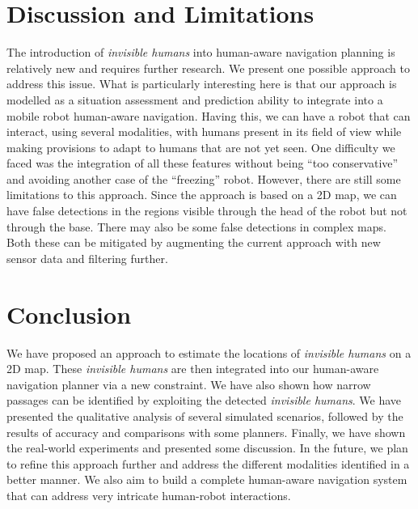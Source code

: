 \section{Discussion and Limitations}\label{discussion_chap5}
The introduction of \textit{invisible humans} into human-aware navigation planning is relatively new and requires further research. We present one possible approach to address this issue. What is particularly interesting here is that our approach is modelled as a situation assessment and prediction ability to integrate into a mobile robot human-aware navigation. Having this, we can have a robot that can interact, using several modalities, with humans present in its field of view while making provisions to adapt to humans that are not yet seen. One difficulty we faced was the integration of all these features without being ``too conservative'' and avoiding another case of the ``freezing'' robot. However, there are still some limitations to this approach. Since the approach is based on a 2D map, we can have false detections in the regions visible through the head of the robot but not through the base. There may also be some false detections in complex maps. Both these can be mitigated by augmenting the current approach with new sensor data and filtering further.

\section{Conclusion}\label{conclude_chap5}
We have proposed an approach to estimate the locations of \textit{invisible humans} on a 2D map. These \textit{invisible humans} are then integrated into our human-aware navigation planner via a new constraint. We have also shown how narrow passages can be identified by exploiting the detected \textit{invisible humans}. We have presented the qualitative analysis of several simulated scenarios, followed by the results of accuracy and comparisons with some planners. Finally, we have shown the real-world experiments and presented some discussion. In the future, we plan to refine this approach further and address the different modalities identified in a better manner. We also aim to build a complete human-aware navigation system that can address very intricate human-robot interactions.



